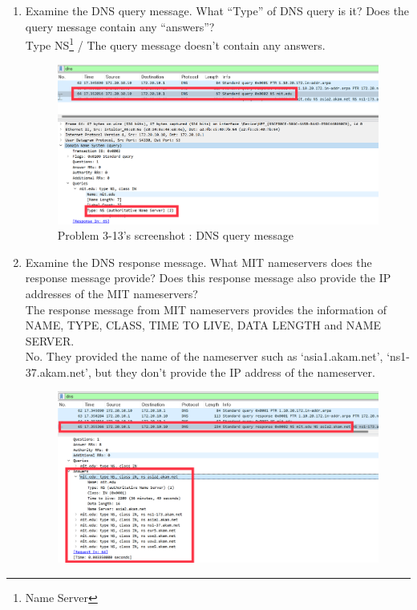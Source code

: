 \begin{enumerate}[label=\bfseries Problem \arabic*:,leftmargin=*,labelindent=1em]
\begin{figure}[!h]
            \end{figure}
        \item Examine the DNS query message. What “Type” of DNS query is it? 
        Does the query message contain any “answers”?\\[0.2mm]
            \soln Type NS\footnote{Name Server} / The query message doesn’t contain any answers.
            \vspace{-2mm}  
            \begin{figure}[!h]\centering
                \hspace{10mm} 
        		\includegraphics[width=.78\textwidth]{image/result_week01/Q3-d.png}
        		\caption{\footnotesize Problem 3-13's screenshot : DNS query message}
        		\vspace{-10pt}
            \end{figure}
        \item Examine the DNS response message. What MIT nameservers does the response message provide? 
        Does this response message also provide the IP addresses of the MIT nameservers?\\[0.2mm]
            \soln The response message from MIT nameservers provides the information of NAME, TYPE, CLASS, TIME TO LIVE, DATA LENGTH and NAME SERVER.\\ 
            No. They provided the name of the nameserver such as ‘asia1.akam.net’, ‘ns1-37.akam.net’, but they don’t provide the IP address of the nameserver.
            \vspace{-2mm}  
            \begin{figure}[!h]\centering
                \hspace{10mm} 
        		\includegraphics[width=.78\textwidth]{image/result_week01/Q3-e-1.png}

\end{figure}
\end{enumerate}
